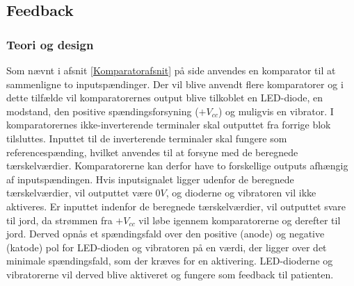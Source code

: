 \subsection{Feedback}
\subsubsection{Teori og design}
Som nævnt i afsnit \ref{Komparatorafsnit} på side \pageref{Komparatorafsnit} anvendes en komparator til at sammenligne to inputspændinger. Der vil blive anvendt flere komparatorer og i dette tilfælde vil komparatorernes output blive tilkoblet en LED-diode, en modstand, den positive spændingsforsyning ($+V_{cc}$) og muligvis en vibrator. I komparatorernes ikke-inverterende terminaler skal outputtet fra forrige blok tilsluttes. Inputtet til de inverterende terminaler skal fungere som referencespænding, hvilket anvendes til at forsyne med de beregnede tærskelværdier. Komparatorerne kan derfor have to forskellige outputs afhængig af inputspændingen. Hvis inputsignalet ligger udenfor de beregnede tærskelværdier, vil outputtet være $0V$, og dioderne og vibratoren vil ikke aktiveres. Er inputtet indenfor de beregnede tærskelværdier, vil outputtet svare til jord, da strømmen fra $+V_{cc}$ vil løbe igennem komparatorerne og derefter til jord. Derved opnås et spændingsfald over den positive (anode) og negative (katode) pol for LED-dioden og vibratoren på en værdi, der ligger over det minimale spændingsfald, som der kræves for en aktivering. LED-dioderne og vibratorerne vil derved blive aktiveret og fungere som feedback til patienten. \\

